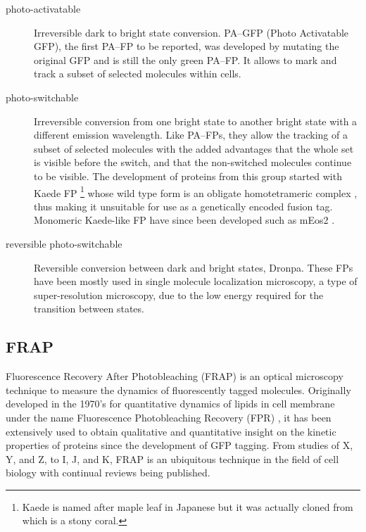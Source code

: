    \begin{description}
      \item[photo-activatable]
        Irreversible dark to bright state conversion.
        PA--GFP (Photo Activatable GFP), the first PA--FP to be
        reported, was developed by mutating the original GFP
        \citep{pagfp-discovery} and is
        still the only green PA--FP.
        It allows to mark and track a subset of selected molecules
        within cells.

      \item[photo-switchable]
        Irreversible conversion from one bright state to another bright
        state with a different emission wavelength.
        Like PA--FPs, they allow the tracking of a subset of selected
        molecules with the added advantages that the whole set is visible
        before the switch, and that the non-switched molecules continue
        to be visible.
        The development of proteins from this group started with Kaede FP
        \footnote{Kaede is named after maple leaf in Japanese but it was
        actually cloned from  which is a
        stony coral.} whose wild type form is an obligate homotetrameric
        complex \citep{kaede-discovery}, thus making it
        unsuitable for use as a genetically encoded fusion tag.
        Monomeric Kaede-like FP have since been developed such as
        mEos2 \citep{meos2-discovery}.

      \item[reversible photo-switchable]
        Reversible conversion between dark and bright states, \eg Dronpa.
        These FPs have been mostly used in single molecule localization
        microscopy, a type of super-resolution microscopy, due to the
        low energy required for the transition between states.

    \end{description}


  \subsection{FRAP}

    Fluorescence Recovery After Photobleaching (FRAP) is an optical
    microscopy technique to measure the dynamics of fluorescently
    tagged molecules.
    Originally developed in the 1970's for quantitative dynamics of lipids
    in cell membrane under the name Fluorescence Photobleaching
    Recovery (FPR) \citep{axelrod1976mobility}, it has
    been extensively used to obtain qualitative and quantitative
    insight on the kinetic properties of proteins since the development
    of GFP tagging.
    From studies of X, Y, and Z, to I, J, and K, FRAP is an ubiquitous
    technique in the field of cell biology with continual reviews being
    published.

